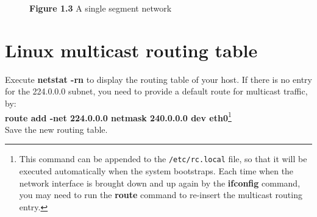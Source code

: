 \documentclass[10pt,a4paper]{article}
\numberwithin{equation}{section}
\numberwithin{figure}{section}
\numberwithin{table}{section}
\begin{document}
    \begin{minipage}{0.48\textwidth}
        \begin{flushright}
            \begin{figure}[H]
                \centering
                \caption{\textbf{Figure 1.3} A single segment network}
                \label{fig:fig13}
            \end{figure}
        \end{flushright}
    \end{minipage}

\section{Linux multicast routing table}
    Execute \textbf{netstat -rn} to display the routing table of your host.
    If there is no entry for the 224.0.0.0 subnet, you need to provide a default route for multicast traffic, by: \\
    \textbf{route add -net 224.0.0.0 netmask 240.0.0.0 dev eth0}\footnote{This command can be appended to the \texttt{/etc/rc.local} file, so that it will be executed automatically when the system bootstraps.
    Each time when the network interface is brought down and up again by the \textbf{ifconfig} command, you may need to run the \textbf{route} command to re-insert the multicast routing entry.} \\
    Save the new routing table.
\end{document}
